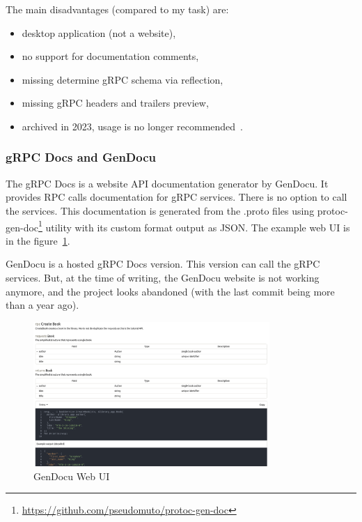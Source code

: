 The main disadvantages (compared to my task) are:
\begin{itemize}
    \item desktop application (not a website),
    \item no support for documentation comments,
    \item missing determine gRPC schema via reflection,
    \item missing gRPC headers and trailers preview,
    \item archived in 2023, usage is no longer recommended~\cite{grpc-bloomrpc}.
\end{itemize}

\subsubsection{gRPC Docs and GenDocu}
The gRPC Docs is a website API documentation generator by GenDocu.
It provides RPC calls documentation for gRPC services.
There is no option to call the services.
This documentation is generated from the .proto files using protoc-gen-doc\footnote{\url{https://github.com/pseudomuto/protoc-gen-doc}} utility with its custom format output as JSON\@.
The example web UI is in the figure~\ref{fig:grpc-gendocu}.
\cite{grpc-gendocu}

GenDocu is a hosted gRPC Docs version.
This version can call the gRPC services.
But, at the time of writing, the GenDocu website is not working anymore, and the project looks abandoned (with the last commit being more than a year ago).
\cite{grpc-gendocu}

\begin{figure}[hbt!]
    \centering
    \captionsetup{justification=centering}
    \includegraphics[width=0.8\textwidth]{images/grpc/gendocu}
    \caption{GenDocu Web UI~\cite{grpc-gendocu}}
    \label{fig:grpc-gendocu}
\end{figure}

